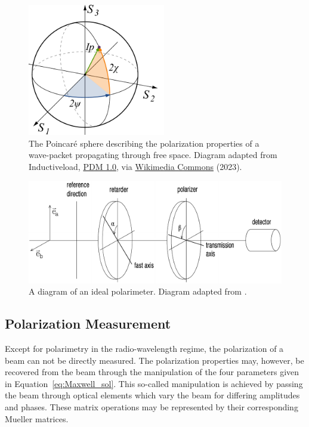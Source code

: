 \begin{figure}[t]
    \centering
    \includegraphics[width=6cm]{figures/2_poincare_sphere.pdf}
    \caption{The Poincar{\'e} sphere describing the polarization properties of a wave-packet propagating through free space. Diagram adapted from Inductiveload, \protect\href{https://creativecommons.org/publicdomain/mark/1.0/}{PDM 1.0}, via \protect\href{https://commons.wikimedia.org/wiki/File:Poincaré_sphere.svg}{Wikimedia Commons} (2023).}
    \label{fig:poincare}
\end{figure}


\begin{figure}[t]
    \centering
    \includegraphics[width=1\textwidth]{figures/2_polarimeter.pdf}
    \caption{A diagram of an ideal polarimeter. Diagram adapted from \cite{pol_in_spectra}.}
    \label{fig:polarimeter}
\end{figure}

\subsection{Polarization Measurement}\label{subsec:pol_measure}

Except for polarimetry in the radio-wavelength regime, the polarization of a beam can not be directly measured. The polarization properties may, however, be recovered from the beam through the manipulation of the four parameters given in Equation~\ref{eq:Maxwell_sol}. This so-called manipulation is achieved by passing the beam through optical elements which vary the beam for differing amplitudes and phases. These matrix operations may be represented by their corresponding Mueller matrices.

